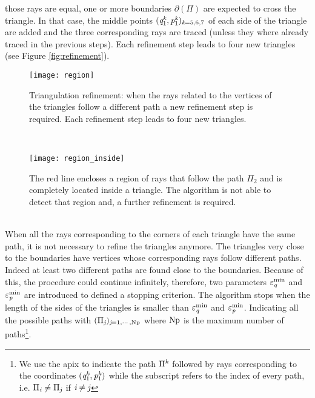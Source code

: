 those rays are equal, one or more boundaries
$\partial$$(\Pi)$ are expected to cross the triangle.
In that case, the middle points $(\textit{q}_1^{\textit{k}},\textit{p}_1^{\textit{k}})_{\textit{k}=5,6,7}$ of each side of the triangle are added and
the three corresponding rays are traced (unless they where already traced in the previous steps). Each refinement step leads to four new triangles (see Figure \ref{fig:refinement}).
 \begin{figure}[h]
 \begin{minipage}[]{\textwidth}
\centering
    \texttt{[image: region]}
  \caption{Triangulation refinement:
  when the rays related to the vertices of the triangles follow a different path a new refinement step is required.
   Each refinement step leads to four new triangles.}
  \label{fig:refinement}
\end{minipage}\\
\begin{minipage}[]{\textwidth}
\centering
    \texttt{[image: region\_inside]}
  \caption{The red line encloses a region of rays that follow the path $\Pi_2$ and is completely located inside a triangle.
  The algorithm is not able to detect that region and, a further refinement is required.}
   \label{fig:region inside}
\end{minipage}
  \end{figure} \\ \indent
When all the rays corresponding to the corners of each triangle have the same path, it is not necessary to refine the triangles anymore.
The triangles very close to the boundaries have vertices whose corresponding rays follow different paths.
Indeed at least two different paths are found close to the boundaries. Because of this, the procedure could continue infinitely, therefore, two parameters $\varepsilon_{\textit{q}}^\textrm{min}$ and $\varepsilon_{\textit{p}}^\textrm{min}$ are introduced to defined a stopping criterion.
The algorithm stops when the length of the sides of the triangles is smaller than $\varepsilon_{\textit{q}}^\textrm{min}$ and $\varepsilon_{\textit{p}}^\textrm{min}$.
Indicating all the possible paths with $(\Pi_{\textit{j}})_{\textit{j}=1, \cdots, \textrm{Np}}$ where $\textrm{Np}$ is the maximum number of paths\footnote{We use the apix to indicate the path $\Pi^{\textit{k}}$ followed by rays corresponding to the coordinates $(\textit{q}_1^{\textit{k}},\textit{p}_1^{\textit{k}})$ while the subscript refers to the index of every path, i.e. $\Pi_{\textit{i}}\neq\Pi_{\textit{j}}$ if $\textit{i}\neq\textit{j}$}.
